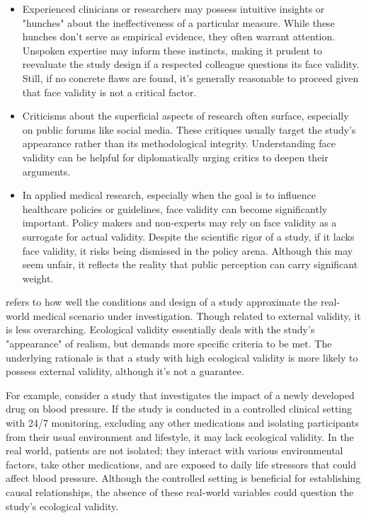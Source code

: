\begin{itemize}
\item Experienced clinicians or researchers may possess intuitive insights or "hunches" about the ineffectiveness of a particular measure. While these hunches don't serve as empirical evidence, they often warrant attention. Unspoken expertise may inform these instincts, making it prudent to reevaluate the study design if a respected colleague questions its face validity. Still, if no concrete flaws are found, it's generally reasonable to proceed given that face validity is not a critical factor.

\item Criticisms about the superficial aspects of research often surface, especially on public forums like social media. These critiques usually target the study's appearance rather than its methodological integrity. Understanding face validity can be helpful for diplomatically urging critics to deepen their arguments.

\item In applied medical research, especially when the goal is to influence healthcare policies or guidelines, face validity can become significantly important. Policy makers and non-experts may rely on face validity as a surrogate for actual validity. Despite the scientific rigor of a study, if it lacks face validity, it risks being dismissed in the policy arena. Although this may seem unfair, it reflects the reality that public perception can carry significant weight.
\end{itemize}


 refers to how well the conditions and design of a study approximate the real-world medical scenario under investigation. Though related to external validity, it is less overarching. Ecological validity essentially deals with the study's "appearance" of realism, but demands more specific criteria to be met. The underlying rationale is that a study with high ecological validity is more likely to possess external validity, although it's not a guarantee.

For example, consider a study that investigates the impact of a newly developed drug on blood pressure. If the study is conducted in a controlled clinical setting with 24/7 monitoring, excluding any other medications and isolating participants from their usual environment and lifestyle, it may lack ecological validity. In the real world, patients are not isolated; they interact with various environmental factors, take other medications, and are exposed to daily life stressors that could affect blood pressure. Although the controlled setting is beneficial for establishing causal relationships, the absence of these real-world variables could question the study's ecological validity.

